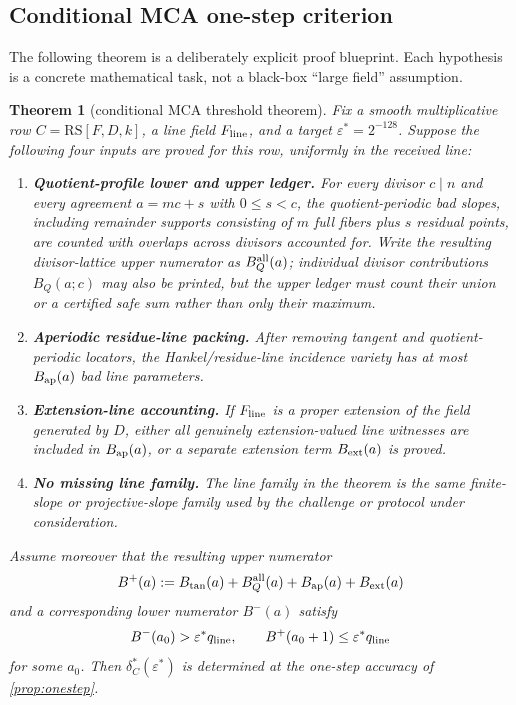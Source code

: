 \documentclass[11pt]{article}
\newtheorem{theorem}{Theorem}[section]
\theoremstyle{definition}
\theoremstyle{remark}
\newcommand{\RS}{\mathrm{RS}}
\begin{document}
\subsection{Conditional MCA one-step criterion}

The following theorem is a deliberately explicit proof blueprint.  Each
hypothesis is a concrete mathematical task, not a black-box ``large field''
assumption.

\begin{theorem}[conditional MCA threshold theorem]\label{thm:conditional-mca}
Fix a smooth multiplicative row $C=\RS[F,D,k]$, a line field $F_{\rm line}$, and
a target $\varepsilon^*=2^{-128}$.  Suppose the following four inputs are proved
for this row, uniformly in the received line:
\begin{enumerate}[label=(\roman*),leftmargin=2.2em]
\item \textbf{Quotient-profile lower and upper ledger.}  For every divisor
$c\mid n$ and every agreement $a=mc+s$ with $0\le s<c$, the quotient-periodic
bad slopes, including remainder supports consisting of $m$ full fibers plus
$s$ residual points, are counted with overlaps across divisors accounted for.
Write the resulting divisor-lattice upper numerator as $B_Q^{\rm all}(a)$;
individual divisor contributions $B_Q(a;c)$ may also be printed, but the upper
ledger must count their union or a certified safe sum rather than only their
maximum.
\item \textbf{Aperiodic residue-line packing.}  After removing tangent and
quotient-periodic locators, the Hankel/residue-line incidence variety has at
most $B_{\rm ap}(a)$ bad line parameters.
\item \textbf{Extension-line accounting.}  If $F_{\rm line}$ is a proper
extension of the field generated by $D$, either all genuinely extension-valued
line witnesses are included in $B_{\rm ap}(a)$, or a separate extension term
$B_{\rm ext}(a)$ is proved.
\item \textbf{No missing line family.}  The line family in the theorem is the
same finite-slope or projective-slope family used by the challenge or protocol
under consideration.
\end{enumerate}
Assume moreover that the resulting upper numerator
\[
        B^+(a):=B_{\rm tan}(a)+B_Q^{\rm all}(a)
                +B_{\rm ap}(a)+B_{\rm ext}(a)
\]
and a corresponding lower numerator $B^-(a)$ satisfy
\[
        B^-(a_0)>\varepsilon^* q_{\rm line},
        \qquad
        B^+(a_0+1)\le\varepsilon^* q_{\rm line}
\]
for some $a_0$.  Then $\delta_C^*(\varepsilon^*)$ is determined at the
one-step accuracy of \cref{prop:onestep}.
\end{theorem}
\end{document}
